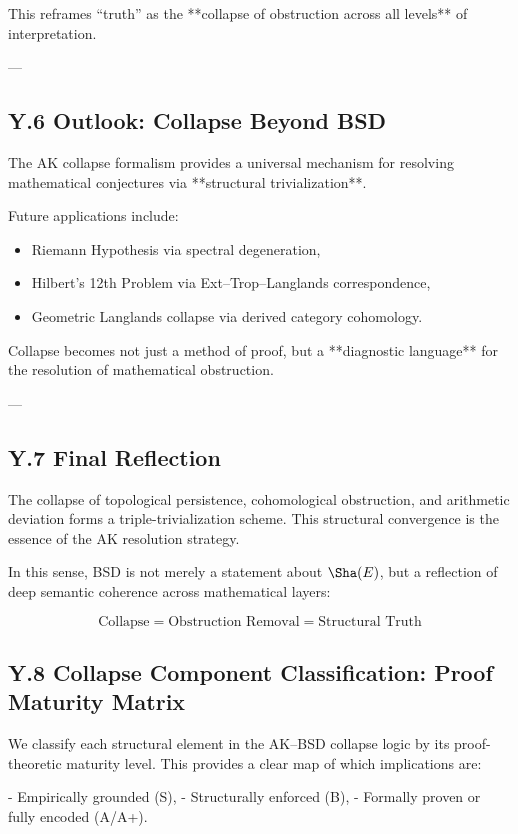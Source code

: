 This reframes “truth” as the **collapse of obstruction across all levels** of interpretation.

---

\subsection*{Y.6 Outlook: Collapse Beyond BSD}

The AK collapse formalism provides a universal mechanism  
for resolving mathematical conjectures via **structural trivialization**.  

Future applications include:
\begin{itemize}
  \item Riemann Hypothesis via spectral degeneration,
  \item Hilbert’s 12th Problem via Ext–Trop–Langlands correspondence,
  \item Geometric Langlands collapse via derived category cohomology.
\end{itemize}

Collapse becomes not just a method of proof,  
but a **diagnostic language** for the resolution of mathematical obstruction.

---

\subsection*{Y.7 Final Reflection}

The collapse of topological persistence, cohomological obstruction,  
and arithmetic deviation forms a triple-trivialization scheme.  
This structural convergence is the essence of the AK resolution strategy.

In this sense, BSD is not merely a statement about \( \Sha(E) \),  
but a reflection of deep semantic coherence across mathematical layers:

\[
\text{Collapse} = \text{Obstruction Removal} = \text{Structural Truth}
\]


\subsection*{Y.8 Collapse Component Classification: Proof Maturity Matrix}

We classify each structural element in the AK–BSD collapse logic by its proof-theoretic maturity level.  
This provides a clear map of which implications are:

- Empirically grounded (S),
- Structurally enforced (B),
- Formally proven or fully encoded (A/A+).

